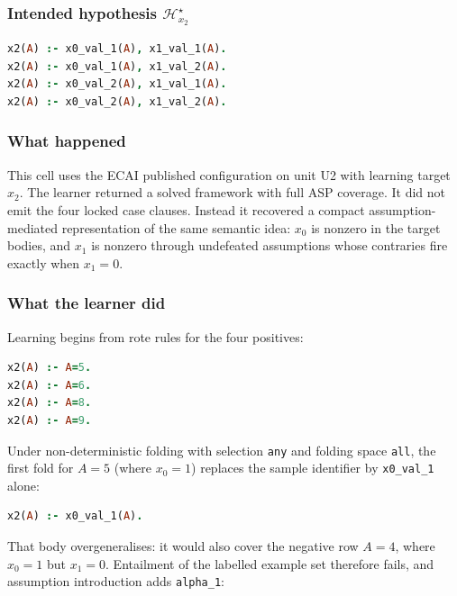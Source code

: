 \documentclass[11pt]{article}
\begin{document}
\subsubsection{\texorpdfstring{Intended hypothesis \(\mathcal{H}_{x_2}^\star\)}{Intended hypothesis H-star(x2)}}

\begin{lstlisting}[style=logic,language=Prolog]
x2(A) :- x0_val_1(A), x1_val_1(A).
x2(A) :- x0_val_1(A), x1_val_2(A).
x2(A) :- x0_val_2(A), x1_val_1(A).
x2(A) :- x0_val_2(A), x1_val_2(A).
\end{lstlisting}

\subsubsection{What happened}

This cell uses the ECAI published configuration on unit U2 with learning target \(x_2\). The learner returned a solved framework with full ASP coverage. It did not emit the four locked case clauses. Instead it recovered a compact assumption-mediated representation of the same semantic idea: \(x_0\) is nonzero in the target bodies, and \(x_1\) is nonzero through undefeated assumptions whose contraries fire exactly when \(x_1=0\).

\subsubsection{What the learner did}

Learning begins from rote rules for the four positives:

\begin{lstlisting}[style=logic,language=Prolog]
x2(A) :- A=5.
x2(A) :- A=6.
x2(A) :- A=8.
x2(A) :- A=9.
\end{lstlisting}

Under non-deterministic folding with selection \texttt{any} and folding space \texttt{all}, the first fold for \(A=5\) (where \(x_0=1\)) replaces the sample identifier by \texttt{x0\_val\_1} alone:

\begin{lstlisting}[style=logic,language=Prolog]
x2(A) :- x0_val_1(A).
\end{lstlisting}

That body overgeneralises: it would also cover the negative row \(A=4\), where \(x_0=1\) but \(x_1=0\). Entailment of the labelled example set therefore fails, and assumption introduction adds \texttt{alpha\_1}:
\end{document}
